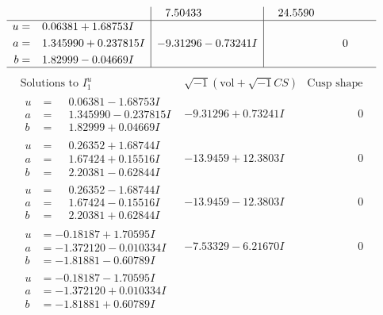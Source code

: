 \documentclass[1p]{elsarticle_modified}
\theoremstyle{definition}
\newcommand{\I}{\sqrt{-1}}
\begin{document}
$$\begin{array}{c|c|c}
 & \phantom{-}7.50433\phantom{ +0.000000I} & \phantom{-}24.5590\phantom{ +0.000000I} \\ \hline\begin{aligned}
u &= \phantom{-}0.06381 + 1.68753 I \\
a &= \phantom{-}1.345990 + 0.237815 I \\
b &= \phantom{-}1.82999 - 0.04669 I\end{aligned}
 & -9.31296 - 0.73241 I & \phantom{-0.000000 } 0\\
 \hline 
 \end{array}$$\newpage$$\begin{array}{c|c|c}  
\text{Solutions to }I^u_{1}& \I (\text{vol} + \sqrt{-1}CS) & \text{Cusp shape}\\
 \hline 
\begin{aligned}
u &= \phantom{-}0.06381 - 1.68753 I \\
a &= \phantom{-}1.345990 - 0.237815 I \\
b &= \phantom{-}1.82999 + 0.04669 I\end{aligned}
 & -9.31296 + 0.73241 I & \phantom{-0.000000 } 0 \\ \hline\begin{aligned}
u &= \phantom{-}0.26352 + 1.68744 I \\
a &= \phantom{-}1.67424 + 0.15516 I \\
b &= \phantom{-}2.20381 - 0.62844 I\end{aligned}
 & -13.9459 + 12.3803 I & \phantom{-0.000000 } 0 \\ \hline\begin{aligned}
u &= \phantom{-}0.26352 - 1.68744 I \\
a &= \phantom{-}1.67424 - 0.15516 I \\
b &= \phantom{-}2.20381 + 0.62844 I\end{aligned}
 & -13.9459 - 12.3803 I & \phantom{-0.000000 } 0 \\ \hline\begin{aligned}
u &= -0.18187 + 1.70595 I \\
a &= -1.372120 - 0.010334 I \\
b &= -1.81881 - 0.60789 I\end{aligned}
 & -7.53329 - 6.21670 I & \phantom{-0.000000 } 0 \\ \hline\begin{aligned}
u &= -0.18187 - 1.70595 I \\
a &= -1.372120 + 0.010334 I \\
b &= -1.81881 + 0.60789 I\end{aligned}

\end{array}$$
\end{document}
